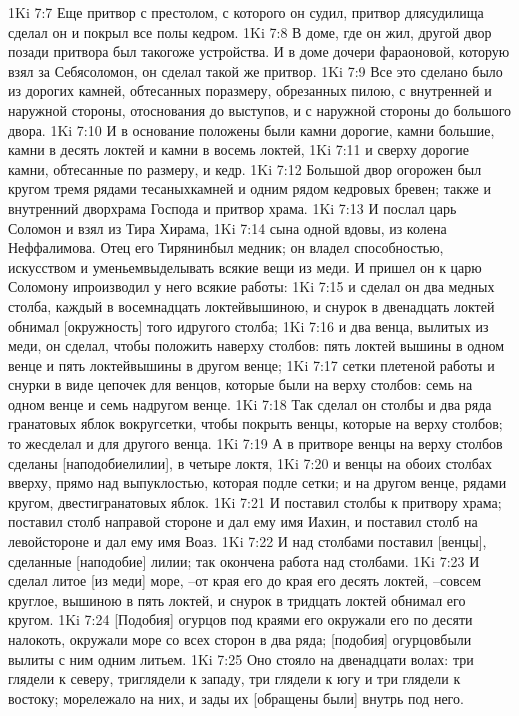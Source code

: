 1Ki 7:7  Еще притвор с престолом, с которого он судил, притвор длясудилища сделал он и покрыл все полы кедром.
1Ki 7:8  В доме, где он жил, другой двор позади притвора был такогоже устройства. И в доме дочери фараоновой, которую взял за Себясоломон, он сделал такой же притвор.
1Ki 7:9  Все это сделано было из дорогих камней, обтесанных поразмеру, обрезанных пилою, с внутренней и наружной стороны, отоснования до выступов, и с наружной стороны до большого двора.
1Ki 7:10  И в основание положены были камни дорогие, камни большие, камни в десять локтей и камни в восемь локтей,
1Ki 7:11  и сверху дорогие камни, обтесанные по размеру, и кедр.
1Ki 7:12  Большой двор огорожен был кругом тремя рядами тесаныхкамней и одним рядом кедровых бревен; также и внутренний дворхрама Господа и притвор храма.
1Ki 7:13  И послал царь Соломон и взял из Тира Хирама,
1Ki 7:14  сына одной вдовы, из колена Неффалимова. Отец его Тирянинбыл медник; он владел способностью, искусством и уменьемвыделывать всякие вещи из меди. И пришел он к царю Соломону ипроизводил у него всякие работы:
1Ki 7:15  и сделал он два медных столба, каждый в восемнадцать локтейвышиною, и снурок в двенадцать локтей обнимал [окружность] того идругого столба;
1Ki 7:16  и два венца, вылитых из меди, он сделал, чтобы положить наверху столбов: пять локтей вышины в одном венце и пять локтейвышины в другом венце;
1Ki 7:17  сетки плетеной работы и снурки в виде цепочек для венцов, которые были на верху столбов: семь на одном венце и семь надругом венце.
1Ki 7:18  Так сделал он столбы и два ряда гранатовых яблок вокругсетки, чтобы покрыть венцы, которые на верху столбов; то жесделал и для другого венца.
1Ki 7:19  А в притворе венцы на верху столбов сделаны [наподобиелилии], в четыре локтя,
1Ki 7:20  и венцы на обоих столбах вверху, прямо над выпуклостью, которая подле сетки; и на другом венце, рядами кругом, двестигранатовых яблок.
1Ki 7:21  И поставил столбы к притвору храма; поставил столб направой стороне и дал ему имя Иахин, и поставил столб на левойстороне и дал ему имя Воаз.
1Ki 7:22  И над столбами поставил [венцы], сделанные [наподобие] лилии; так окончена работа над столбами.
1Ki 7:23  И сделал литое [из меди] море, --от края его до края его десять локтей, --совсем круглое, вышиною в пять локтей, и снурок в тридцать локтей обнимал его кругом.
1Ki 7:24  [Подобия] огурцов под краями его окружали его по десяти налокоть, окружали море со всех сторон в два ряда; [подобия] огурцовбыли вылиты с ним одним литьем.
1Ki 7:25  Оно стояло на двенадцати волах: три глядели к северу, триглядели к западу, три глядели к югу и три глядели к востоку; морележало на них, и зады их [обращены были] внутрь под него.
